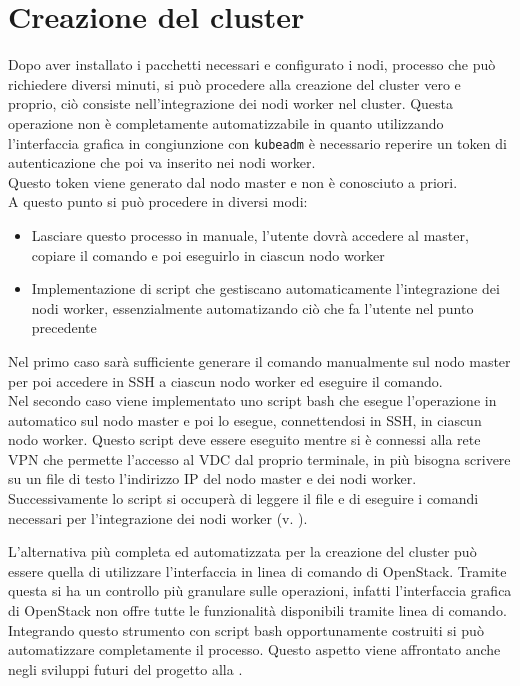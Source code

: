 \documentclass[12pt,a4paper,openright,twoside]{book}
\begin{document}
\section{Creazione del cluster}
\label{sec:cluster-creation}
Dopo aver installato i pacchetti necessari e configurato i nodi, processo che può richiedere diversi minuti, si può procedere alla creazione del cluster vero e proprio,
ciò consiste nell'integrazione dei nodi worker nel cluster. Questa operazione non è completamente automatizzabile in quanto utilizzando
l'interfaccia grafica in congiunzione con \texttt{kubeadm} è necessario reperire un token di autenticazione che poi va inserito nei nodi worker.\\
Questo token viene generato dal nodo master e non è conosciuto a priori.\\
A questo punto si può procedere in diversi modi:
\begin{itemize}
    \item Lasciare questo processo in manuale, l'utente dovrà accedere al master, copiare il comando e poi eseguirlo in ciascun nodo worker
    \item Implementazione di script che gestiscano automaticamente l'integrazione dei nodi worker, essenzialmente automatizando ciò che fa l'utente nel punto precedente
\end{itemize}
Nel primo caso sarà sufficiente generare il comando manualmente sul nodo master per poi accedere in SSH a ciascun nodo worker ed eseguire il comando.\\
Nel secondo caso viene implementato uno script bash che esegue l'operazione in automatico sul nodo master e poi lo esegue, connettendosi in SSH, in ciascun nodo worker. 
Questo script deve essere eseguito mentre si è connessi alla rete VPN che permette l'accesso al VDC dal proprio terminale, in più bisogna scrivere su un file di testo l'indirizzo IP del nodo master e dei nodi worker.
Successivamente lo script si occuperà di leggere il file e di eseguire i comandi necessari per l'integrazione dei nodi worker (v. ).


L'alternativa più completa ed automatizzata per la creazione del cluster può essere quella di utilizzare l'interfaccia in linea di comando di OpenStack.
Tramite questa si ha un controllo più granulare sulle operazioni, infatti l'interfaccia grafica di OpenStack non offre tutte le funzionalità disponibili tramite linea di comando.
Integrando questo strumento con script bash opportunamente costruiti si può automatizzare completamente il processo.
Questo aspetto viene affrontato anche negli sviluppi futuri del progetto alla .
\end{document}
